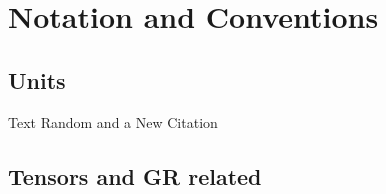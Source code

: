 
\chapter*{Notation and Conventions}

\section*{Units}

Text Random and a New Citation

\section*{Tensors and GR related}

\lipsum[3]

\cleardoublepage